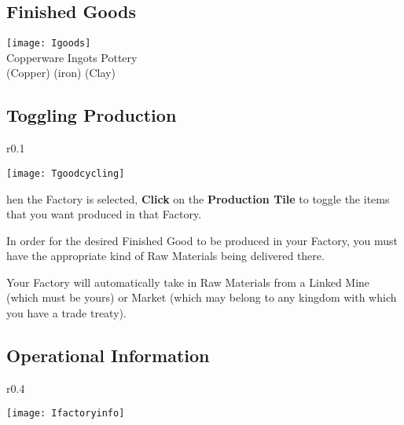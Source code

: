 \subsection{\textsf{Finished Goods}}


\begin{center}
    \texttt{[image: Igoods]} %
    \\ Copperware Ingots Pottery
    \\ (Copper) (iron) (Clay)
\end{center}

\subsection{\textsf{Toggling Production}}


\begin{wrapfigure}{r}{0.1\textwidth}
    \vspace{-20pt}
    \begin{center}
        \texttt{[image: Tgoodcycling]}
    \end{center}
    \vspace{-20pt}
\end{wrapfigure}


hen the Factory is selected, \textbf{Click} on the \textbf{Production Tile} to toggle the items that you want produced in that Factory.

In order for the desired Finished Good to be produced in your Factory, you must have the appropriate kind of Raw Materials being delivered there.

Your Factory will automatically take in Raw Materials from a Linked Mine (which must be yours) or Market (which may belong to any kingdom with which you have a trade treaty).

\subsection{\textsf{Operational Information}}


\begin{wrapfigure}{r}{0.4\textwidth}
    \vspace{-20pt}
    \begin{center}
        \texttt{[image: Ifactoryinfo]} %
    \end{center}
    \vspace{-20pt}
\end{wrapfigure}


